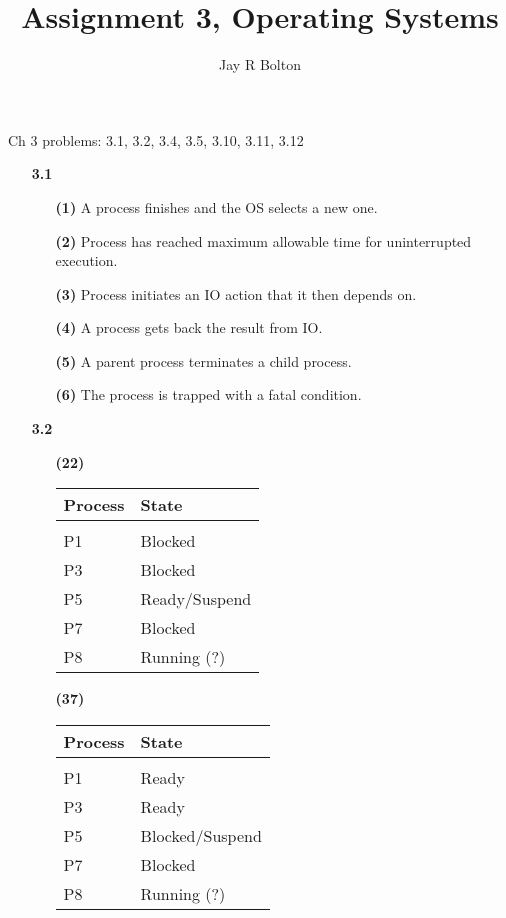 \documentclass{article}
\title{Assignment 3, Operating Systems}
\author{Jay R Bolton}
\begin{document}
\maketitle

Ch 3 problems: 3.1, 3.2, 3.4, 3.5, 3.10, 3.11, 3.12

\begin{enumerate}

\item[\textbf{3.1}]
  \begin{enumerate}
    \item[\textbf{(1)}]
      A process finishes and the OS selects a new one.
    \item[\textbf{(2)}]
      Process has reached maximum allowable time for uninterrupted
      execution.
    \item[\textbf{(3)}]
      Process initiates an IO action that it then depends on.
    \item[\textbf{(4)}]
      A process gets back the result from IO.
    \item[\textbf{(5)}]
      A parent process terminates a child process.
    \item[\textbf{(6)}]
      The process is trapped with a fatal condition.
  \end{enumerate}

\item[\textbf{3.2}]
  \begin{enumerate}
    \item[\textbf{(22)}]
      \begin{tabular}{l | l}
      \textbf{Process} & \textbf{State} \\
      \hline \\
      P1 & Blocked \\
      P3 & Blocked \\
      P5 & Ready/Suspend \\
      P7 & Blocked \\
      P8 & Running (?) \\
      \end{tabular}
      
    \item[\textbf{(37)}]
      \begin{tabular}{l | l}
      \textbf{Process} & \textbf{State} \\
      \hline \\
      P1 & Ready \\
      P3 & Ready \\
      P5 & Blocked/Suspend \\
      P7 & Blocked \\
      P8 & Running (?) \\
      \end{tabular}
      

\end{enumerate}
\end{enumerate}
\end{document}
